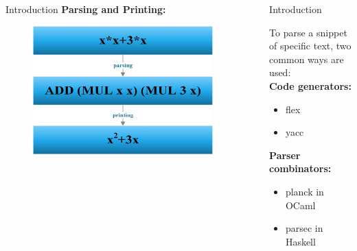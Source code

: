 \documentclass[final]{beamer}
\newlength{\sepwid}
\newlength{\onecolwid}
\newlength{\twocolwid}
\begin{document}
\begin{frame}[t]
\begin{columns}[t]
\begin{column}{\onecolwid}
\begin{block}{Introduction}
\textbf{Parsing and Printing:}

\begin{figure}
\includegraphics[width=0.75\linewidth]{img/parseprintershort.png}
\end{figure}


\end{block}


\end{column} %

\begin{column}{\sepwid}\end{column} %

\begin{column}{\twocolwid} %

\begin{columns}[t,totalwidth=\twocolwid] %

\begin{column}{\onecolwid}\vspace{-.6in} %


\begin{block}{Introduction}

To parse a snippet of specific text, two common ways are used: \\
\textbf{Code generators:}
\begin{itemize}
\item flex
\item yacc
\end{itemize}
\textbf{Parser combinators:}
\begin{itemize}
\item planck in OCaml
\item parsec in Haskell
\end{itemize}


\end{block}
\end{column}
\end{columns}
\end{column}
\end{columns}
\end{frame}
\end{document}
